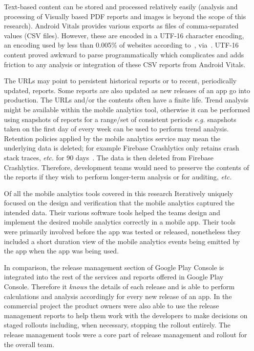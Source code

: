 Text-based content can be stored and processed relatively easily (analysis and processing of Visually based PDF reports and images is beyond the scope of this research). Android Vitals provides various exports as files of comma-separated values (CSV files).  However, these are encoded in a UTF-16 character encoding, an encoding used by less than 0.005\% of websites according to~\citet{w3techs_utf16}, via~\citep{wikipedia_utf16}. UTF-16 content proved awkward to parse programmatically which complicates and adds friction to any analysis or integration of these CSV reports from Android Vitals.

The URLs may point to persistent historical reports or to recent, periodically updated, reports. Some reports are also updated as new releases of an app go into production. The URLs and/or the contents often have a finite life. Trend analysis might be available within the mobile analytics tool, otherwise it can be performed using snapshots of reports for a range/set of consistent periods \emph{e.g.} snapshots taken on the first day of every week can be used to perform trend analysis. Retention policies applied by the mobile analytics service may mean the underlying data is deleted; for example Firebase Crashlytics only retains crash stack traces, \emph{etc.} for 90 days~\citep{firebasesupport2022_crashlytics_data_retention_policy}. The data is then deleted from Firebase Crashlytics. Therefore, development teams would need to preserve the contents of the reports if they wish to perform longer-term analysis or for auditing, \emph{etc.}

Of all the mobile analytics tools covered in this research Iteratively uniquely focused on the design and verification that the mobile analytics captured the intended data. Their various software tools helped the teams design and implement the desired mobile analytics correctly in a mobile app. Their tools were primarily involved before the app was tested or released, nonetheless they included a short duration view of the mobile analytics events being emitted by the app when the app was being used.

In comparison, the release management section of Google Play Console is integrated into the rest of the services and reports offered in Google Play Console. Therefore it \emph{knows} the details of each release and is able to perform calculations and analysis accordingly for every new release of an app. In the commercial project the product owners were also able to use the release management reports to help them work with the developers to make decisions on staged rollouts including, when necessary, stopping the rollout entirely. The release management tools were a core part of release management and rollout for the overall team. %

